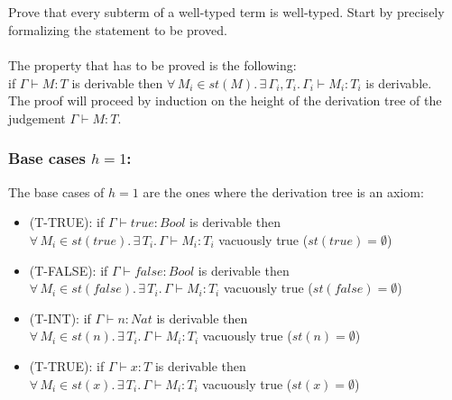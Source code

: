 \subsection{}

Prove that every subterm of a well-typed term is well-typed. Start by
precisely formalizing the statement to be proved.\\~\\
The property that has to be proved is the following:\\
if $\Gamma \vdash M:T$ is derivable then
$\forall\,M_i \in st(M).\,\exists\,\Gamma_i, T_i.\, \Gamma_i \vdash M_i: T_i$
is derivable.\\
The proof will proceed by induction on the height of the derivation
tree of the judgement $\Gamma \vdash M: T$.

\subsubsection*{Base cases $h = 1$:}
The base cases of $h = 1$ are the ones where the derivation tree is
an axiom:
\begin{itemize}
	\item (T-TRUE): if $\Gamma \vdash true: Bool$ is derivable then\\
	      $\forall\,M_i \in st(true).\,\exists\,T_i.\, \Gamma \vdash M_i: T_i$
	      vacuously true ($st(true) = \emptyset$)
	\item (T-FALSE): if $\Gamma \vdash false: Bool$ is derivable then\\
	      $\forall\,M_i \in st(false).\,\exists\,T_i.\, \Gamma \vdash M_i: T_i$
	      vacuously true ($st(false) = \emptyset$)
	\item (T-INT): if $\Gamma \vdash n: Nat$ is derivable then\\
	      $\forall\,M_i \in st(n).\,\exists\,T_i.\, \Gamma \vdash M_i: T_i$
	      vacuously true ($st(n) = \emptyset$)
	\item (T-TRUE): if $\Gamma \vdash x: T$ is derivable then\\
	      $\forall\,M_i \in st(x).\,\exists\,T_i.\, \Gamma \vdash M_i: T_i$
	      vacuously true ($st(x) = \emptyset$)
\end{itemize}

